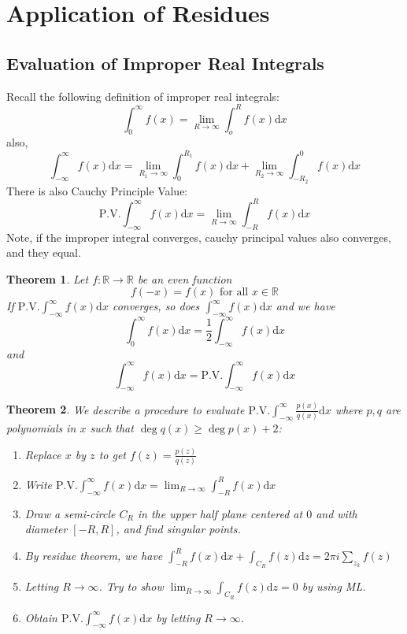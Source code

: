 \documentclass[12pt]{article}
\newcommand{\diff}{\mathrm{d}}
\newtheorem{theorem}{Theorem}[section]
\theoremstyle{definition}
\begin{document}
\section{Application of Residues}
\subsection{Evaluation of Improper Real Integrals}
Recall the following definition of improper real integrals:
\[
\int_0^\infty f(x)=\lim_{R\to\infty}\int_o^R f(x)\diff x
\]
also, 
\[
\int_{-\infty}^\infty f(x)\diff x = \lim_{R_1\to \infty}\int_0^{R_1}f(x)\diff x + \lim_{R_2\to\infty}\int_{-R_2}^0 f(x)\diff x
\]
There is also Cauchy Principle Value:
\[
\text{P.V.}\int_{-\infty}^\infty f(x)\diff x = \lim_{R\to\infty}\int_{-R}^R f(x)\diff x
\]
Note, if the improper integral converges, cauchy principal values also converges, and they equal.
\begin{theorem}\normalfont Let $f:\mathbb{R}\to\mathbb{R}$ be an even function
\[
f(-x) = f(x)\text{ for all }x\in \mathbb{R}
\]
If $\text{P.V.} \int_{-\infty}^\infty f(x)\diff x$ converges, so does $\int_{-\infty}^\infty f(x)\diff x$ and we have
\[
\int_0^\infty f(x)\diff x = \frac{1}{2}\int_{-\infty}^\infty f(x)\diff x
\]
and
\[
\int_{-\infty}^\infty f(x)\diff x = \text{P.V.}\int_{-\infty}^\infty f(x)\diff x
\]
\end{theorem}
\begin{theorem}
\normalfont We describe a procedure to evaluate $\text{P.V.}\int_{-\infty}^\infty \frac{p(x)}{q(x)}\diff x$ where $p,q$ are polynomials in $x$ such that $\deg q(x)\geq \deg p(x) + 2$:
\begin{enumerate}
	\item Replace $x$ by $z$ to get $f(z)=\frac{p(z)}{q(z)}$
	\item Write $\text{P.V.}\int_{-\infty}^\infty f(x)\diff x = \lim_{R\to\infty} \int_{-R}^R f(x)\diff x$
	\item Draw a semi-circle $C_R$ in the upper half plane centered at $0$ and with diameter $[-R, R]$, and find singular points.
	\item By residue theorem, we have $\int_{-R}^R f(x)\diff x + \int_{C_R}f(z)\diff z = 2\pi i\sum_{z_k}f(z)$
	\item Letting $R\to\infty$. Try to show $\lim_{R\to\infty} \int_{C_R}f(z)\diff z =0$ by using ML.
	\item Obtain $\text{P.V.}\int_{-\infty}^\infty f(x)\diff x$ by letting $R\to\infty$.
\end{enumerate}
\end{theorem}
\end{document}
